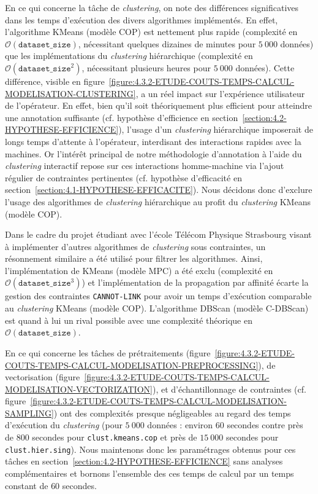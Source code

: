 			En ce qui concerne la tâche de \textit{clustering}, on note des différences significatives dans les temps d'exécution des divers algorithmes implémentés.
			En effet, l'algorithme KMeans (modèle COP) est nettement plus rapide (complexité en $ \mathcal{O}(\texttt{dataset\_size}) $, nécessitant quelques dizaines de minutes pour $5~000$ données) que les implémentations du \textit{clustering} hiérarchique (complexité en $ \mathcal{O}(\texttt{dataset\_size}^{2}) $, nécessitant plusieurs heures pour $5~000$ données).
			Cette différence, visible en figure~\ref{figure:4.3.2-ETUDE-COUTS-TEMPS-CALCUL-MODELISATION-CLUSTERING}, a un réel impact sur l'expérience utilisateur de l'opérateur.
			En effet, bien qu'il soit théoriquement plus efficient pour atteindre une annotation suffisante (cf. hypothèse d'efficience en section~\ref{section:4.2-HYPOTHESE-EFFICIENCE}), l'usage d'un \textit{clustering} hiérarchique imposerait de longs temps d'attente à l'opérateur, interdisant des interactions rapides avec la machines.
			Or l'intérêt principal de notre méthodologie d'annotation à l'aide du \textit{clustering} interactif repose sur ces interactions homme-machine via l'ajout régulier de contraintes pertinentes (cf. hypothèse d'efficacité en section~\ref{section:4.1-HYPOTHESE-EFFICACITE}).
			Nous décidons donc d'exclure l'usage des algorithmes de \textit{clustering} hiérarchique au profit du \textit{clustering} KMeans (modèle COP).
			
			\begin{leftBarInformation}
				Dans le cadre du projet étudiant avec l'école Télécom Physique Strasbourg visant à implémenter d'autres algorithmes de \textit{clustering} sous contraintes, un résonnement similaire a été utilisé pour filtrer les algorithmes. Ainsi, l'implémentation de KMeans (modèle MPC) a été exclu (complexité en $ \mathcal{O}(\texttt{dataset\_size}^{3}) $) et l'implémentation de la propagation par affinité écarte la gestion des contraintes \texttt{CANNOT-LINK} pour avoir un temps d'exécution comparable au \textit{clustering} KMeans (modèle COP). L'algorithme DBScan (modèle C-DBScan) est quand à lui un rival possible avec une complexité théorique en $ \mathcal{O}(\texttt{dataset\_size}) $.
			\end{leftBarInformation}
			
			En ce qui concerne les tâches de prétraitements (figure~\ref{figure:4.3.2-ETUDE-COUTS-TEMPS-CALCUL-MODELISATION-PREPROCESSING}), de vectorisation (figure~\ref{figure:4.3.2-ETUDE-COUTS-TEMPS-CALCUL-MODELISATION-VECTORIZATION}), et d'échantillonnage de contraintes (cf. figure~\ref{figure:4.3.2-ETUDE-COUTS-TEMPS-CALCUL-MODELISATION-SAMPLING}) ont des complexités presque négligeables au regard des temps d'exécution du \textit{clustering} (pour $5~000$ données : environ $60$ secondes contre près de $800$ secondes pour \texttt{clust.kmeans.cop} et près de $15~000$ secondes pour \texttt{clust.hier.sing}).
			Nous maintenons donc les paramétrages obtenus pour ces tâches en section~\ref{section:4.2-HYPOTHESE-EFFICIENCE} sans analyses complémentaires et bornons l'ensemble des ces temps de calcul par un temps constant de $60$ secondes.
			
